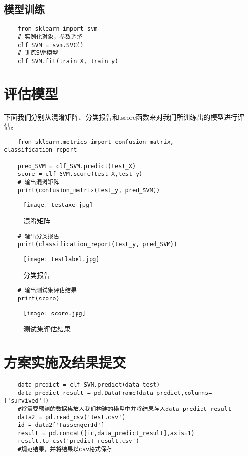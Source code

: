 \documentclass[AutoFakeBold]{LZUThesis}
\begin{document}
\section{模型训练}
\begin{lstlisting}
    from sklearn import svm
    # 实例化对象，参数调整
    clf_SVM = svm.SVC()
    # 训练SVM模型
    clf_SVM.fit(train_X, train_y)    
\end{lstlisting}
\chapter{评估模型}
下面我们分别从混淆矩阵、分类报告和.score函数来对我们所训练出的模型进行评估。
\begin{lstlisting}
    from sklearn.metrics import confusion_matrix, classification_report

    pred_SVM = clf_SVM.predict(test_X)
    score = clf_SVM.score(test_X,test_y)
    # 输出混淆矩阵
    print(confusion_matrix(test_y, pred_SVM))
\end{lstlisting}
\begin{figure}[htbp]
    \centering
    \texttt{[image: testaxe.jpg]}
    \caption{混淆矩阵}
\end{figure}
\begin{lstlisting}
    # 输出分类报告
    print(classification_report(test_y, pred_SVM))
\end{lstlisting}
\begin{figure}[htbp]
    \centering
    \texttt{[image: testlabel.jpg]}
    \caption{分类报告}
\end{figure}
\begin{lstlisting}
    # 输出测试集评估结果
    print(score)
\end{lstlisting}
\begin{figure}[htbp]
    \centering
    \texttt{[image: score.jpg]}
    \caption{测试集评估结果}
\end{figure}
\chapter{方案实施及结果提交}
\begin{lstlisting}
    data_predict = clf_SVM.predict(data_test)
    data_predict_result = pd.DataFrame(data_predict,columns=['survived'])
    #将需要预测的数据集放入我们构建的模型中并将结果存入data_predict_result
    data2 = pd.read_csv('test.csv')
    id = data2['PassengerId']
    result = pd.concat([id,data_predict_result],axis=1)
    result.to_csv('predict_result.csv')
    #规范结果，并将结果以csv格式保存
\end{lstlisting}
\end{document}
